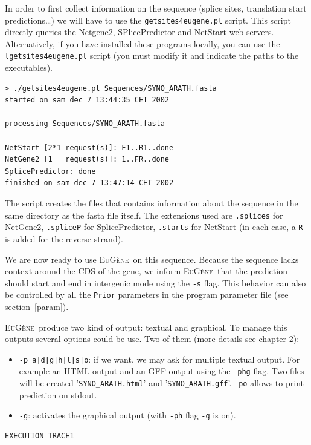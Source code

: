 \documentclass[a4paper,titlepage]{report}
\newcommand{\EuGene}{\textsc{EuG\`ene}}
\begin{document}
In order to first collect information on the sequence (splice sites,
translation start predictions\ldots) we will have to use the
\texttt{getsites4eugene.pl} script. This script directly queries the
Netgene2, SPlicePredictor and NetStart web servers. Alternatively, if
you have installed these programs locally, you can use the
\texttt{lgetsites4eugene.pl} script (you must modify it and indicate
the paths to the executables). 

\begin{Verbatim}[fontsize=\scriptsize]
> ./getsites4eugene.pl Sequences/SYNO_ARATH.fasta 
started on sam dec 7 13:44:35 CET 2002

processing Sequences/SYNO_ARATH.fasta

NetStart [2*1 request(s)]: F1..R1..done
NetGene2 [1   request(s)]: 1..FR..done
SplicePredictor: done
finished on sam dec 7 13:47:14 CET 2002
\end{Verbatim}

The script creates the files that contains information about the
sequence in the same directory as the fasta file itself. The
extensions used are \texttt{.splices} for NetGene2, \texttt{.spliceP}
for SplicePredictor, \texttt{.starts} for NetStart (in each case, a
\texttt{R} is added for the reverse strand). 

We are now ready to use \EuGene\ on this sequence. Because the
sequence lacks context around the CDS of the gene, we inform \EuGene\ 
that the prediction should start and end in intergenic mode using the
\texttt{-s} flag. This behavior can also be controlled by all the
\texttt{Prior} parameters in the program parameter file (see
section~\ref{param}).

\EuGene\ produce two kind of output: textual and graphical. To manage this outputs
several options could be use. Two of them (more details see chapter 2):
\begin{itemize}
\item \texttt{-p a|d|g|h|l|s|o}: if we want, we may ask for multiple textual output. For example an HTML output
and an GFF output using the \texttt{-phg} flag. Two files will be created '\texttt{SYNO\_ARATH.html}'
and '\texttt{SYNO\_ARATH.gff}'. \texttt{-po} allows to print prediction on stdout.
\item \texttt{-g}: activates the graphical output (with \texttt{-ph} flag \texttt{-g} is on).\\
\end{itemize}

\begin{Verbatim}[fontsize=\scriptsize]
EXECUTION_TRACE1
\end{Verbatim}
\end{document}
